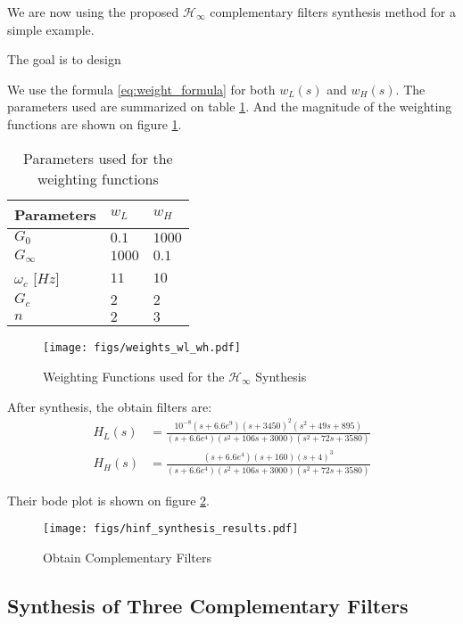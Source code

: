 \documentclass[9pt, technote, a4paper]{ieeeconf}
\begin{document}
We are now using the proposed \(\mathcal{H}_\infty\) complementary filters synthesis method for a simple example.

The goal is to design

We use the formula \eqref{eq:weight_formula} for both \(w_L(s)\) and \(w_H(s)\).
The parameters used are summarized on table \ref{tab:weights_params}. And the magnitude of the weighting functions are shown on figure \ref{fig:weights_wl_wh}.

\begin{table}[!htpb]
\caption{\label{tab:weights_params}
Parameters used for the weighting functions}
\centering
\begin{tabular}{|l|X|X|}
\hline
Parameters & \(w_L\) & \(w_H\)\\
\hline
\(G_0\) & \(0.1\) & \(1000\)\\
\hline
\(G_\infty\) & \(1000\) & \(0.1\)\\
\hline
\(\omega_c\) [\(\si{Hz}\)] & \(11\) & \(10\)\\
\hline
\(G_c\) & \(2\) & \(2\)\\
\hline
\(n\) & \(2\) & \(3\)\\
\hline
\end{tabular}
\end{table}


\begin{figure}[htbp]
\centering
\texttt{[image: figs/weights\_wl\_wh.pdf]}
\caption{\label{fig:weights_wl_wh}
Weighting Functions used for the \(\mathcal{H}_\infty\) Synthesis}
\end{figure}

After synthesis, the obtain filters are:
\begin{align}
  H_L(s) &= \frac{10^{-8} (s+6.6e^9) (s+3450)^2 (s^2 + 49s + 895)}{(s+6.6e^4) (s^2 + 106 s + 3000) (s^2 + 72s + 3580)}\\
  H_H(s) &= \frac{(s+6.6e^4) (s+160) (s+4)^3}{(s+6.6e^4) (s^2 + 106 s + 3000) (s^2 + 72s + 3580)}
\end{align}

Their bode plot is shown on figure \ref{fig:hinf_synthesis_results}.

\begin{figure}[htbp]
\centering
\texttt{[image: figs/hinf\_synthesis\_results.pdf]}
\caption{\label{fig:hinf_synthesis_results}
Obtain Complementary Filters}
\end{figure}

\subsection{Synthesis of Three Complementary Filters}
\label{sec:orgbc6a88d}
\label{sec:hinf_three_comp_filters}
\end{document}
